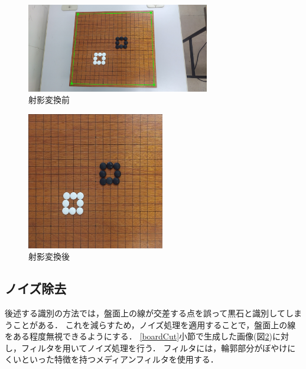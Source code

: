 \documentclass[openright]{nitocs}
\numberwithin{equation}{section}
\begin{document}
            \begin{figure}[tb] %
                \begin{center}
                \includegraphics[clip,width=80mm]{cornerImg.jpg} 
                \caption{射影変換前}
                \label{cornerImg}
                \end{center}
            \end{figure}
            \begin{figure}[tb] %
                \begin{center}
                \includegraphics[clip,width=60mm]{boardImg.jpg} 
                \caption{射影変換後}
                \label{boardImg}
                \end{center}
            \end{figure}

        \subsection{ノイズ除去}
        \label{noiseReduce}
            後述する識別の方法では，盤面上の線が交差する点を誤って黒石と識別してしまうことがある．
            これを減らすため，ノイズ処理を適用することで，盤面上の線をある程度無視できるようにする． 
            \ref{boardCut}小節で生成した画像(図\ref{boardImg})に対し，フィルタを用いてノイズ処理を行う．
            フィルタには，輪郭部分がぼやけにくいといった特徴を持つメディアンフィルタを使用する．
            
\end{document}
